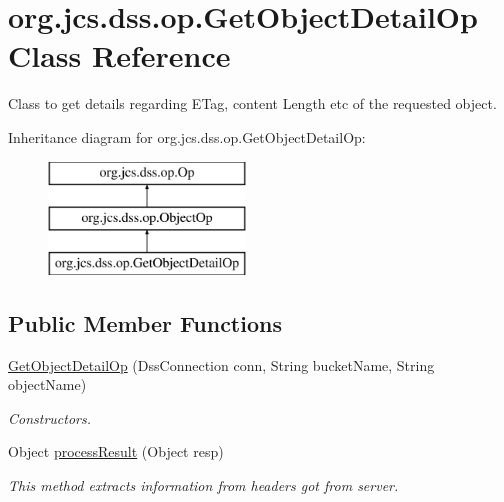 \hypertarget{classorg_1_1jcs_1_1dss_1_1op_1_1GetObjectDetailOp}{}\section{org.\+jcs.\+dss.\+op.\+Get\+Object\+Detail\+Op Class Reference}
\label{classorg_1_1jcs_1_1dss_1_1op_1_1GetObjectDetailOp}


Class to get details regarding E\+Tag, content Length etc of the requested object.  


Inheritance diagram for org.\+jcs.\+dss.\+op.\+Get\+Object\+Detail\+Op\+:\begin{figure}[H]
\begin{center}
\leavevmode
\includegraphics[height=3.000000cm]{classorg_1_1jcs_1_1dss_1_1op_1_1GetObjectDetailOp}
\end{center}
\end{figure}
\subsection*{Public Member Functions}
\begin{DoxyCompactItemize}
\item 
\hyperlink{classorg_1_1jcs_1_1dss_1_1op_1_1GetObjectDetailOp_a282d865ccd75dddc2b956059a6171a75}{Get\+Object\+Detail\+Op} (Dss\+Connection conn, String bucket\+Name, String object\+Name)\hypertarget{classorg_1_1jcs_1_1dss_1_1op_1_1GetObjectDetailOp_a282d865ccd75dddc2b956059a6171a75}{}\label{classorg_1_1jcs_1_1dss_1_1op_1_1GetObjectDetailOp_a282d865ccd75dddc2b956059a6171a75}

\begin{DoxyCompactList}\small\item\em Constructors. \end{DoxyCompactList}\item 
Object \hyperlink{classorg_1_1jcs_1_1dss_1_1op_1_1GetObjectDetailOp_a5498a9b8d534ffc0a74e2ecad3833fdd}{process\+Result} (Object resp)
\begin{DoxyCompactList}\small\item\em This method extracts information from headers got from server. \end{DoxyCompactList}\end{DoxyCompactItemize}
